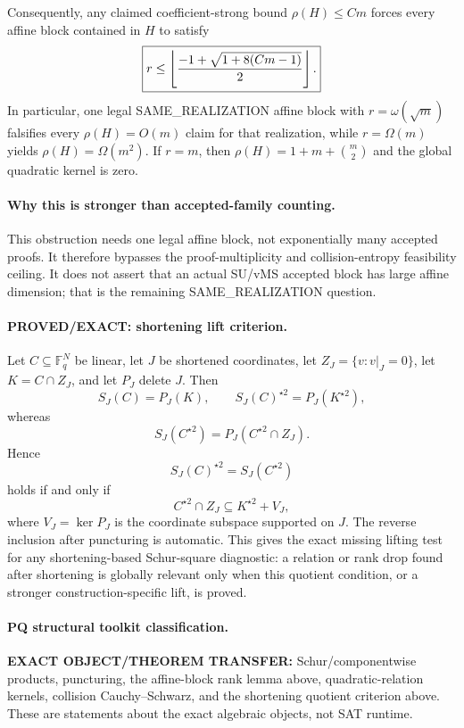\documentclass[11pt]{article}
\begin{document}
Consequently, any claimed coefficient-strong bound $\rho(H)\le C m$ forces every affine block contained in $H$ to satisfy
\[
\boxed{
r\le \left\lfloor { -1+\sqrt{1+8(Cm-1)}\over 2}\right\rfloor.
}
\]
In particular, one legal SAME\_REALIZATION affine block with $r=\omega(\sqrt m)$ falsifies every $\rho(H)=O(m)$ claim for that realization, while $r=\Omega(m)$ yields $\rho(H)=\Omega(m^2)$. If $r=m$, then $\rho(H)=1+m+\binom m2$ and the global quadratic kernel is zero.

\paragraph{Why this is stronger than accepted-family counting.}
This obstruction needs one legal affine block, not exponentially many accepted proofs. It therefore bypasses the proof-multiplicity and collision-entropy feasibility ceiling. It does not assert that an actual SU/vMS accepted block has large affine dimension; that is the remaining SAME\_REALIZATION question.

\paragraph{PROVED/EXACT: shortening lift criterion.}
Let $C\subseteq\mathbb F_q^N$ be linear, let $J$ be shortened coordinates, let $Z_J=\{v:v|_J=0\}$, let $K=C\cap Z_J$, and let $P_J$ delete $J$. Then
\[
S_J(C)=P_J(K),\qquad S_J(C)^{\star2}=P_J(K^{\star2}),
\]
whereas
\[
S_J(C^{\star2})=P_J(C^{\star2}\cap Z_J).
\]
Hence
\[
\boxed{S_J(C)^{\star2}=S_J(C^{\star2})}
\]
holds if and only if
\[
\boxed{C^{\star2}\cap Z_J\subseteq K^{\star2}+V_J,}
\]
where $V_J=\ker P_J$ is the coordinate subspace supported on $J$. The reverse inclusion after puncturing is automatic. This gives the exact missing lifting test for any shortening-based Schur-square diagnostic: a relation or rank drop found after shortening is globally relevant only when this quotient condition, or a stronger construction-specific lift, is proved.

\paragraph{PQ structural toolkit classification.}
\textbf{EXACT OBJECT/THEOREM TRANSFER:} Schur/componentwise products, puncturing, the affine-block rank lemma above, quadratic-relation kernels, collision Cauchy--Schwarz, and the shortening quotient criterion above. These are statements about the exact algebraic objects, not SAT runtime.
\end{document}
